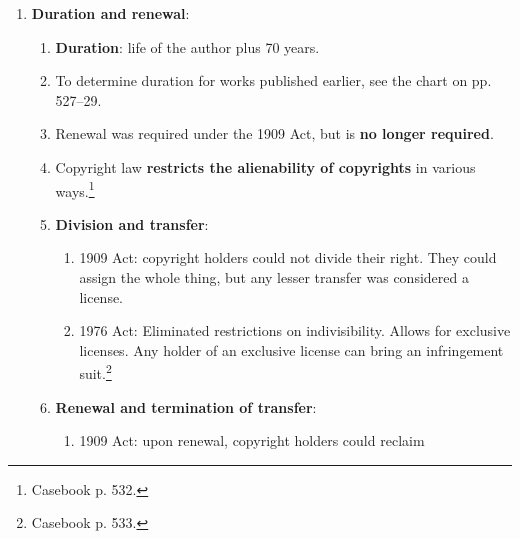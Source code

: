\begin{enumerate}
\begin{enumerate}
\begin{enumerate}
            enumerated categories (``work made for hire,'' \S\ 101). Courts 
            apply the common law agency rule. See \emph{CCNV v. Reid} and p. 
            512 top.
            \item \textbf{Joint work}: required (1) a copyrightable work, (2) 
            two or more authors, and (3) intent to merge contributions into an 
            inseparable or interdependent unitary whole. \emph{Aalmuhammed v.  
            Lee}.
            \item \textbf{Collective works}: copyright in a contribution is 
            distinct from copyright in the entire collection. \S\ 201(c).
            \item (See ``Analyzing IP Ownership Problems.'')
        \end{enumerate}
        \item \textbf{Duration and renewal}:
        \begin{enumerate}
            \item \textbf{Duration}: life of the author plus 70 years.
            \item To determine duration for works published earlier, see the 
            chart on pp. 527--29.
            \item Renewal was required under the 1909 Act, but is \textbf{no 
            longer required}.
            \item Copyright law \textbf{restricts the alienability of 
            copyrights} in various ways.\footnote{Casebook p. 532.}
            \item \textbf{Division and transfer}:
            \begin{enumerate}
                \item 1909 Act: copyright holders could not divide their 
                right. They could assign the whole thing, but any lesser 
                transfer was considered a license.
                \item 1976 Act: Eliminated restrictions on indivisibility. 
                Allows for exclusive licenses. Any holder of an exclusive 
                license can bring an infringement suit.\footnote{Casebook p.  
                533.}
            \end{enumerate}
            \item \textbf{Renewal and termination of transfer}:
            \begin{enumerate}
                \item 1909 Act: upon renewal, copyright holders could reclaim 

\end{enumerate}
\end{enumerate}
\end{enumerate}
\end{enumerate}
